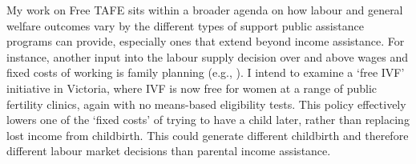  My work on Free TAFE sits within a broader agenda on how labour and general welfare outcomes vary by the different types of support public assistance programs can provide, especially ones that extend beyond income assistance. For instance, another input into the labour supply decision over and above wages and fixed costs of working is family planning (e.g., \cite{gallen2026}). I intend to examine a `free IVF' initiative in Victoria, where IVF is now free for women at a range of public fertility clinics, again with no means-based eligibility tests. This policy effectively lowers one of the `fixed costs' of trying to have a child later, rather than replacing lost income from childbirth. This could generate different childbirth and therefore different labour market decisions than parental income assistance.








